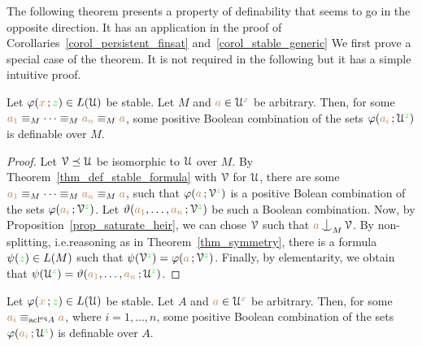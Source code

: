 
The following theorem presents a property of definability that seems to go in the opposite direction.
It has an application in the proof of Corollaries~\ref{corol_persistent_finsat} and~\ref{corol_stable_generic}
We first prove a special case of the theorem.
It is not required in the following but it has a simple intuitive proof.

\begin{proposition}
  Let $\varphi({\color{brown} x}\,;{\color{green} z})\in L(\EuScript U)$ be stable.
  Let $M$ and ${\color{brown} a}\in\EuScript U^{\color{brown} x}$ be arbitrary.
  Then, for some ${\color{brown} a_1}\equiv_M\dots\equiv_M{\color{brown} a_n}\equiv_M{\color{brown} a}$, some positive Boolean combination of the sets $\varphi({\color{brown} a_i}\,;\EuScript U^{\color{green} z})$ is definable over $M$.
\end{proposition}

\begin{proof}
  Let $\EuScript V\preceq\EuScript U$ be isomorphic to $\EuScript U$ over $M$.
  By Theorem~\ref{thm_def_stable_formula} with $\EuScript V$ for $\EuScript U$, there are  some ${\color{brown} a_1}\equiv_M\dots\equiv_M{\color{brown} a_n}\equiv_M{\color{brown} a}$, such that $\varphi({\color{brown} a}\,;\EuScript V^{\color{green} z})$ is a positive Bolean combination of the sets $\varphi({\color{brown} a_i}\,;\EuScript V^{\color{green} z})$.
  Let $\vartheta({\color{brown} a_1},\dots,{\color{brown} a_n}\,;\EuScript V^{\color{green} z})$ be such a Boolean combination.
  Now, by Proposition~\ref{prop_saturate_heir}, we can chose $\EuScript V$ such that ${\mr a}\nonfork_M\V$.
  By non-splitting, i.e.\@ reasoning as in Theorem~\ref{thm_symmetry}, there is a formula $\psi({\color{green} z})\in L(M)$ such that $\psi(\EuScript V^{\color{green} z})=\varphi({\color{brown} a}\,;\EuScript V^{\color{green} z})$.
  Finally, by elementarity, we obtain that $\psi(\EuScript U^{\color{green} z})=\vartheta({\color{brown} a_1},\dots,{\color{brown} a_n}\,;\EuScript U^{\color{green} z})$.
\end{proof}

\begin{theorem}\label{thm_stability_definable_rovescio}
  Let $\varphi({\color{brown} x}\,;{\color{green} z})\in L(\EuScript U)$ be stable.
  Let $A$ and ${\color{brown} a}\in\EuScript U^{\color{brown} x}$ be arbitrary.
  Then, for some ${\color{brown} a_i}\equiv_{\mathop{\rm acl}^{{\rm eq}}\!A}{\color{brown} a}$, where $i=1,\dots,n$, some positive Boolean combination of the sets $\varphi({\color{brown} a_i}\,;\EuScript U^{\color{green} z})$ is definable over $A$.
\end{theorem}

